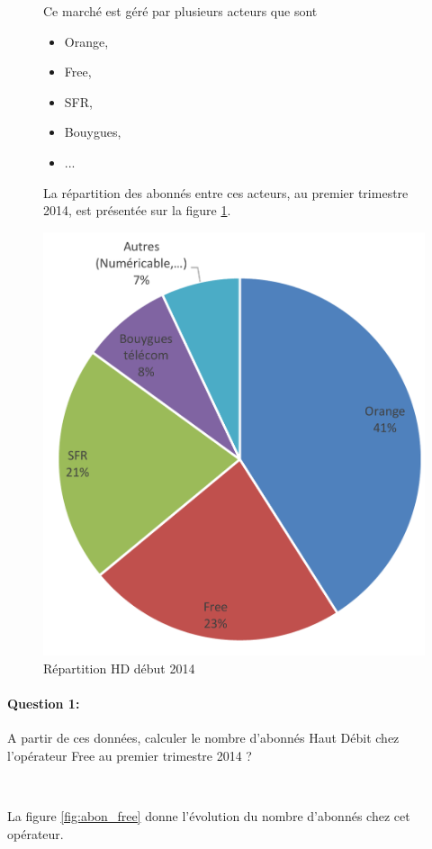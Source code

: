 \begin{figure}[htbp]
\begin{minipage}{0.45\linewidth}
Ce marché est géré par plusieurs acteurs que sont \begin{itemize}
\item Orange, \item Free, \item SFR, \item Bouygues, \item ...
\end{itemize}

La répartition des abonnés entre ces acteurs, au premier trimestre 2014, est présentée sur la figure \ref{fig:HD_cam}.
\end{minipage}
\hfill
\begin{minipage}{0.5\linewidth}
\begin{center}
\includegraphics[width=0.7\linewidth]{img/HD_cam}
\caption{Répartition HD début 2014}
\label{fig:HD_cam}
\end{center}
\end{minipage}
\end{figure}

\paragraph{Question 1:} A partir de ces données, calculer le nombre d'abonnés Haut Débit chez l'opérateur Free au premier trimestre 2014 ?

~\

La figure \ref{fig:abon_free} donne l'évolution du nombre d'abonnés chez cet opérateur.

